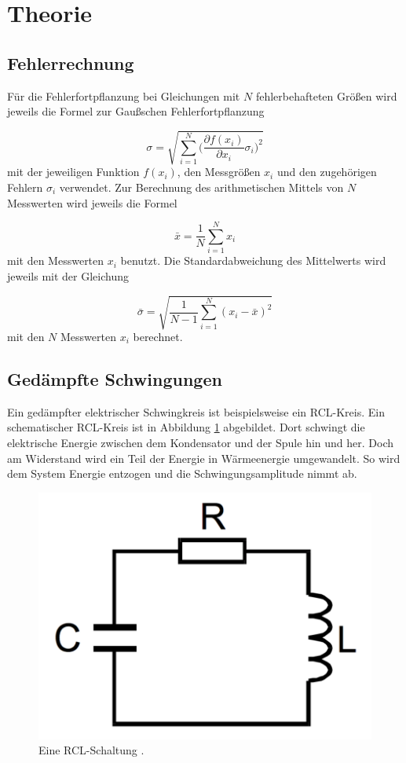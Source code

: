 \section{Theorie}
\label{sec:Theorie}

\subsection{Fehlerrechnung}

Für die Fehlerfortpflanzung bei Gleichungen mit $N$ fehlerbehafteten Größen
wird jeweils die Formel zur Gaußschen Fehlerfortpflanzung

\begin{equation}
  \sigma = \sqrt{\sum_{i=1}^{N}\biggl(\frac{\partial f(x_i)}{\partial x_i}
  \sigma_i\biggr)^2}
\end{equation}
mit der jeweiligen Funktion $f(x_i)$, den Messgrößen $x_i$ und den
zugehörigen Fehlern $\sigma_i$ verwendet.
Zur Berechnung des arithmetischen Mittels von $N$ Messwerten wird jeweils die
Formel

\begin{equation}
  \bar{x} = \frac{1}{N}\sum_{i=1}^{N}x_i
\end{equation}
mit den Messwerten $x_i$ benutzt.
Die Standardabweichung des Mittelwerts wird jeweils mit der Gleichung

\begin{equation}
  \bar{\sigma} = \sqrt{\frac{1}{N-1}\sum_{i=1}^{N}(x_i - \bar{x})^2}
\end{equation}
mit den $N$ Messwerten $x_i$ berechnet.

\subsection{Gedämpfte Schwingungen}
\label{sec:gedschw}

Ein gedämpfter elektrischer Schwingkreis ist beispielsweise ein RCL-Kreis.
 Ein schematischer RCL-Kreis ist
in Abbildung \ref{fig:rcl} abgebildet.
Dort schwingt die elektrische Energie zwischen dem Kondensator und der Spule
hin und her. Doch am Widerstand wird ein Teil der Energie in Wärmeenergie umgewandelt.
So wird dem System Energie entzogen und die Schwingungsamplitude nimmt ab.

\begin{figure}[h]
  \centering
  \includegraphics[height = 4 cm]{RCL.pdf}
  \caption{Eine RCL-Schaltung \cite{anleitung}.}
  \label{fig:rcl}
\end{figure}

